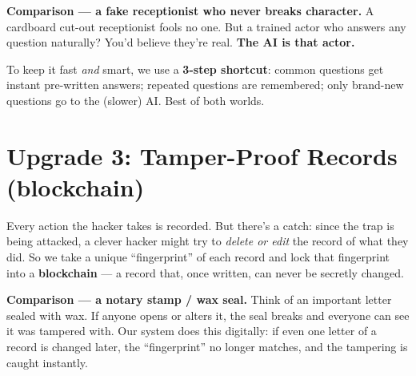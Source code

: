 \documentclass[11pt]{article}
\begin{document}
\begin{analogy}
\textbf{Comparison --- a fake receptionist who never breaks character.} A cardboard
cut-out receptionist fools no one. But a trained actor who answers any question
naturally? You'd believe they're real. \textbf{The AI is that actor.}
\end{analogy}

To keep it fast \emph{and} smart, we use a \textbf{3-step shortcut}: common
questions get instant pre-written answers; repeated questions are remembered; only
brand-new questions go to the (slower) AI. Best of both worlds.

\vspace{4pt}
\begin{center}
\end{center}

\section*{\color{blue}Upgrade 3: Tamper-Proof Records (blockchain)}

Every action the hacker takes is recorded. But there's a catch: since the trap is
being attacked, a clever hacker might try to \emph{delete or edit} the record of
what they did. So we take a unique ``fingerprint'' of each record and lock that
fingerprint into a \textbf{blockchain} --- a record that, once written, can never
be secretly changed.

\begin{analogy}
\textbf{Comparison --- a notary stamp / wax seal.} Think of an important letter
sealed with wax. If anyone opens or alters it, the seal breaks and everyone can
see it was tampered with. Our system does this digitally: if even one letter of
a record is changed later, the ``fingerprint'' no longer matches, and the
tampering is caught instantly.
\end{analogy}
\end{document}
